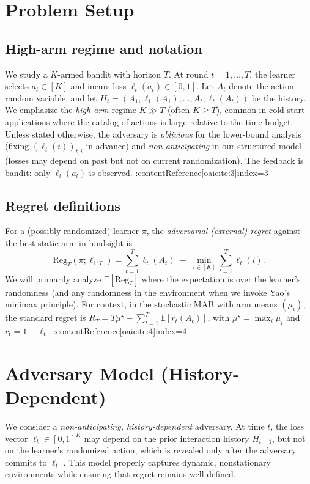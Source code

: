 \documentclass[10pt,twocolumn]{article}
\newcommand{\E}{\mathbb{E}}
\newcommand{\Reg}{\mathrm{Reg}}
\theoremstyle{definition}
\theoremstyle{remark}
\begin{document}
\section{Problem Setup}
\label{sec:setup}

\subsection{High-arm regime and notation}
We study a $K$-armed bandit with horizon $T$. At round $t=1,\dots,T$, the learner selects $a_t\in[K]$ and incurs loss $\ell_t(a_t)\in[0,1]$. Let $A_t$ denote the action random variable, and let $H_t=(A_1,\ell_1(A_1),\dots,A_t,\ell_t(A_t))$ be the history. We emphasize the \emph{high-arm} regime $K\gg T$ (often $K\ge T$), common in cold-start applications where the catalog of actions is large relative to the time budget. Unless stated otherwise, the adversary is \emph{oblivious} for the lower-bound analysis (fixing $(\ell_t(i))_{t,i}$ in advance) and \emph{non-anticipating} in our structured model (losses may depend on past but not on current randomization). The feedback is bandit: only $\ell_t(a_t)$ is observed. \citep{LS20,BubeckCesaBianchi2012,Auer2002Nonstochastic}  :contentReference[oaicite:3]{index=3}

\subsection{Regret definitions}
For a (possibly randomized) learner $\pi$, the \emph{adversarial (external) regret} against the best static arm in hindsight is
\[
  \Reg_T(\pi;\ell_{1:T}) = \sum_{t=1}^T \ell_t(A_t)\;-\;\min_{i\in[K]}\sum_{t=1}^T \ell_t(i).
\]
We will primarily analyze $\E[\Reg_T]$ where the expectation is over the learner’s randomness (and any randomness in the environment when we invoke Yao’s minimax principle). For context, in the stochastic MAB with arm means $(\mu_i)$, the standard regret is $R_T = T\mu^\star - \sum_{t=1}^T \E[r_t(A_t)]$, with $\mu^\star=\max_i \mu_i$ and $r_t=1-\ell_t$. \citep{CBL2006,BubeckCesaBianchi2012,LS20,Robbins1952}  :contentReference[oaicite:4]{index=4}


\section{Adversary Model (History-Dependent)}
\label{sec:adversary}

We consider a \emph{non-anticipating, history-dependent} adversary. At time \(t\), the loss vector
\(\ell_t \in [0,1]^K\) may depend on the prior interaction history \(H_{t-1}\), but not on the learner’s randomized action, which is revealed only after the adversary commits to \(\ell_t\) \citep{LS20}. This model properly captures dynamic, nonstationary environments while ensuring that regret remains well-defined.
\end{document}
